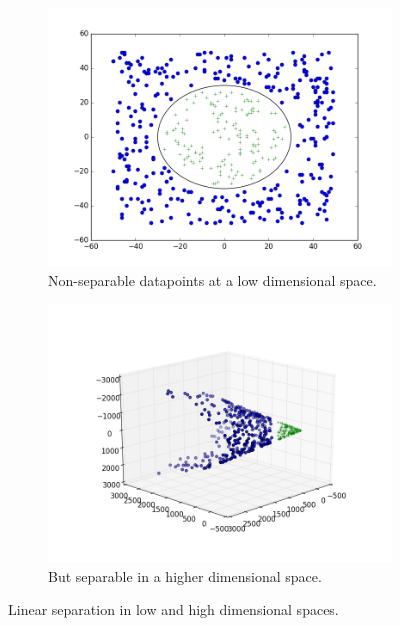 \begin{figure}
\begin{subfigure}[t]{0.5\linewidth}
\centering
\includegraphics[width=\linewidth]{images/svm_2d}
\caption{Non-separable datapoints at a low dimensional space.}
\label{fig:svm_nonsep:2d}
\end{subfigure}%
%
\begin{subfigure}[t]{0.5\linewidth}
\centering
\includegraphics[width=\linewidth]{images/svm_3d}
\caption{But separable in a higher dimensional space.}
\label{fig:svm_nonsep:3d}
\end{subfigure}
\caption{Linear separation in low and high dimensional spaces.}
\label{fig:svm_nonsep}
\end{figure}

